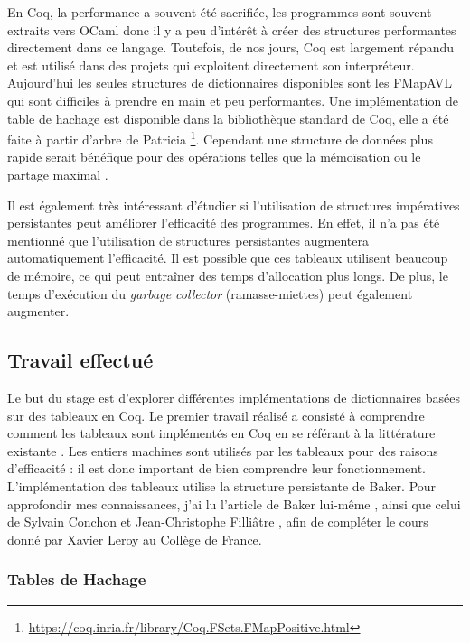 \documentclass{article}
\begin{document}
  En Coq, la performance a souvent été sacrifiée, les programmes sont souvent
extraits vers OCaml donc il y a peu d'intérêt à créer des structures performantes
directement dans ce langage. Toutefois, de nos jours, Coq est largement répandu
et est utilisé dans des projets qui exploitent directement son interpréteur.
Aujourd'hui les seules structures de dictionnaires disponibles sont les
FMapAVL qui sont difficiles à prendre en main et peu performantes. Une
implémentation de table de hachage est disponible dans la bibliothèque standard
de Coq, elle a été faite à partir d'arbre de Patricia
\footnote{\url{https://coq.inria.fr/library/Coq.FSets.FMapPositive.html}}.
Cependant une structure de données plus rapide serait bénéfique pour des
opérations telles que la mémoïsation ou le partage maximal
\cite{braibant2014implementing}.

  Il est également très intéressant d'étudier si l'utilisation de structures
impératives persistantes peut améliorer l'efficacité des programmes. En effet,
il n'a pas été mentionné que l'utilisation de structures persistantes augmentera
automatiquement l'efficacité. Il est possible que ces tableaux utilisent
beaucoup de mémoire, ce qui peut entraîner des temps d'allocation plus longs.
De plus, le temps d'exécution du \textit{garbage collector} (ramasse-miettes)
peut également augmenter.

    \newpage
    \subsection{Travail effectué}

Le but du stage est d'explorer différentes implémentations de dictionnaires
basées sur des tableaux en Coq. Le premier travail réalisé a consisté à
comprendre comment les tableaux sont implémentés en Coq en se référant à la
littérature existante \cite{armand2010extending}. Les entiers machines sont
utilisés par les tableaux pour des raisons d'efficacité : il est donc important
de bien comprendre leur fonctionnement. L'implémentation des tableaux utilise
la structure persistante de Baker. Pour approfondir mes connaissances, j'ai lu
l'article de Baker lui-même \cite{baker1991shallow}, ainsi que celui de
Sylvain Conchon et Jean-Christophe Filliâtre \cite{conchon2007persistent}, afin
de compléter le cours donné par Xavier Leroy au Collège de France.

    \subsubsection{Tables de Hachage}
\end{document}
